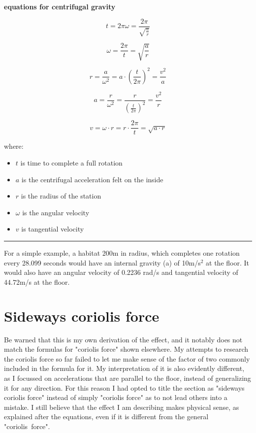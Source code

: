 \documentclass[a4paper]{article}
\begin{document}
	\begin{center}
		\textbf{equations for centrifugal gravity}
	\end{center}
	
	$$ t = 2\pi\omega = \frac{2 \pi}{\sqrt{\frac{a}{r}}} $$
	
	$$ \omega = \frac{2 \pi}{t} = \sqrt{\frac{a}{r}} $$
	
	$$ r =  \frac{a}{\omega^2}= a \cdot \left( \frac{t}{2 \pi} \right)^2 = \frac{v^2}{a}$$
	
	$$ a = \frac{r}{\omega^2} = \frac{r}{\left( \frac{t}{2 \pi} \right)^2} = \frac{v^2}{r}$$
	
	$$ v = \omega \cdot r = r \cdot \frac{2 \pi}{t} = \sqrt{a \cdot r}$$
	
	where:
	
	\begin{itemize}
		\item $t$ is time to complete a full rotation
		
		\item $a$ is the centrifugal acceleration felt on the inside
		
		\item $r$ is the radius of the station
		
		\item $\omega$ is the angular velocity
		
		\item $v$ is tangential velocity
	\end{itemize}
	
	\medskip
	
	\noindent \rule{\linewidth}{1pt}
	
	\medskip
	
	For a simple example, a habitat 200m in radius, which completes one rotation every 28.099 seconds would have an internal gravity (a) of 10m/s$^2$ at the floor. It would also have an angular velocity of 0.2236 rad/s and tangential velocity of 44.72m/s at the floor.
	
	\pagebreak
	
	\section{Sideways coriolis force}
	
	Be warned that this is my own derivation of the effect, and it notably does not match the formulas for "coriolis force" shown elsewhere. My attempts to research the coriolis force so far failed to let me make sense of the factor of two commonly included in the formula for it. My interpretation of it is also evidently different, as I focussed on accelerations that are parallel to the floor, instead of generalizing it for any direction. For this reason I had opted to title the section as "sideways coriolis force" instead of simply "coriolis force" as to not lead others into a mistake. I still believe that the effect I am describing makes physical sense, as explained after the equations, even if it is different from the general "coriolis~force".
	
\end{document}
